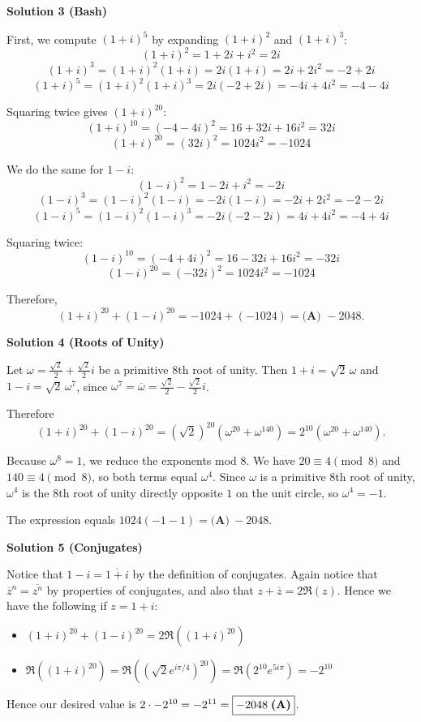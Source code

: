\begin{enumerate}
\textbf{Solution 3 (Bash)}

First, we compute $(1+i)^5$ by expanding $(1+i)^2$ and $(1+i)^3$:
 \[(1+i)^2=1+2i+i^2=2i\]
 \[(1+i)^3=(1+i)^2(1+i)=2i(1+i)=2i+2i^2=-2+2i\]
 \[(1+i)^5=(1+i)^2(1+i)^3=2i(-2+2i)=-4i+4i^2=-4-4i\]

 Squaring twice gives $(1+i)^{20}$:
 \[(1+i)^{10}=(-4-4i)^2=16+32i+16i^2=32i\]
 \[(1+i)^{20}=(32i)^2=1024i^2=-1024\]

 We do the same for $1-i$:
 \[(1-i)^2=1-2i+i^2=-2i\]
 \[(1-i)^3=(1-i)^2(1-i)=-2i(1-i)=-2i+2i^2=-2-2i\]
 \[(1-i)^5=(1-i)^2(1-i)^3=-2i(-2-2i)=4i+4i^2=-4+4i\]

 Squaring twice:
 \[(1-i)^{10}=(-4+4i)^2=16-32i+16i^2=-32i\]
 \[(1-i)^{20}=(-32i)^2=1024i^2=-1024\]

 Therefore,
 \[(1+i)^{20}+(1-i)^{20}=-1024+(-1024)=\boxed{\textbf{(A) }-2048}.\]




\textbf{Solution 4 (Roots of Unity)}

Let $\omega = \frac{\sqrt{2}}{2} + \frac{\sqrt{2}}{2}i$ be a primitive $8$th root of unity. Then $1 + i = \sqrt{2}\,\omega$ and $1 - i = \sqrt{2}\,\omega^7$, since $\omega^7 = \overline{\omega} = \frac{\sqrt{2}}{2} - \frac{\sqrt{2}}{2}i$.

 Therefore
 \[(1 + i)^{20} + (1 - i)^{20} = (\sqrt{2})^{20}\left(\omega^{20} + \omega^{140}\right) = 2^{10}\left(\omega^{20} + \omega^{140}\right).\]

 Because $\omega^8 = 1$, we reduce the exponents mod $8$. We have $20 \equiv 4 \pmod{8}$ and $140 \equiv 4 \pmod{8}$, so both terms equal $\omega^4$. Since $\omega$ is a primitive $8$th root of unity, $\omega^4$ is the $8$th root of unity directly opposite $1$ on the unit circle, so $\omega^4 = -1$.

 The expression equals $1024(-1 - 1) = \boxed{\textbf{(A)}~-2048}$.

 


 



\textbf{Solution 5 (Conjugates)}

Notice that $1-i=\overline{1+i}$ by the definition of conjugates. Again notice that $\overline{z}^n=\overline{z^n}$ by properties of conjugates, and also that $z+\overline z=2\Re(z)$. Hence we have the following if $z=1+i$:

 
            \begin{itemize}
        \item $(1+i)^{20}+(1-i)^{20}=2\Re((1+i)^{20})$
        \item $\Re((1+i)^{20})=\Re\left(\left(\sqrt 2e^{i\pi /4}\right)^{20}\right)=\Re(2^{10}e^{5i\pi})=-2^{10}$
            \end{itemize}
            Hence our desired value is $2\cdot -2^{10}=-2^{11}=\boxed{-2048\hspace{1mm}\textbf{(A)}}$.


\end{enumerate}
